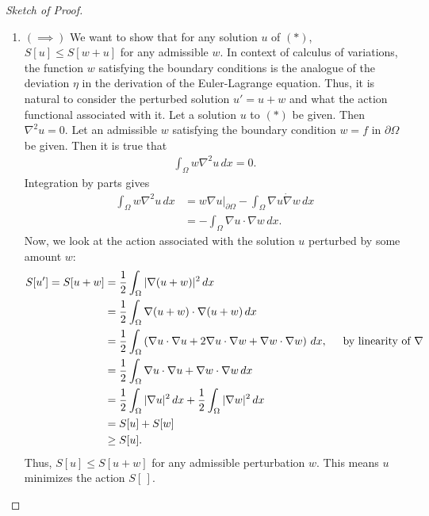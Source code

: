 \documentclass{article}
\newcommand{\p}{\partial}
\newcommand{\f}[2]{\frac{#1}{#2}}
\newcommand{\lp}{\left(}
\newcommand{\rp}{\right)}
\begin{document}
\begin{proof}[Sketch of Proof]
	$\,$
	\begin{enumerate}
		\item $(\implies)$ We want to show that for any solution $u$ of $(\ast)$, $S[u] \leq S[w+u]$ for any admissible $w$. In context of calculus of variations, the function $w$ satisfying the boundary conditions is the analogue of the deviation $\eta$ in the derivation of the Euler-Lagrange equation. Thus, it is natural to consider the perturbed solution $u' = u + w$ and what the action functional associated with it. Let a solution $u$ to $(\ast)$ be given. Then $\nabla^2u = 0$. Let an admissible $w$ satisfying the boundary condition $w = f$ in $\p \Omega$ be given. Then it is true that
		\begin{align}
		\int_\Omega w\nabla^2 u\,dx = 0.
		\end{align}
		Integration by parts gives
		\begin{align}
		\int_\Omega w\nabla^2 u\,dx &= w\nabla u\bigg\vert_{\p\Omega} - \int_\Omega \nabla u \dot \nabla w\,dx \nonumber \\
		&= - \int_\Omega \nabla u \cdot \nabla w\,dx.
		\end{align}
		Now, we look at the action associated with the solution $u$ perturbed by some amount $w$: 
		\begin{align}
		S[u'] = S[u+w] &= \f{1}{2}\int_\Omega \vert \nabla(u+w) \vert^2\,dx \nonumber \\
		&=  \f{1}{2}\int_\Omega \nabla(u+w) \cdot \nabla(u+w)\,dx \nonumber \\
		&= \f{1}{2}\int_\Omega \lp\nabla u \cdot \nabla u + 2 \nabla u \cdot \nabla w + \nabla w \cdot \nabla w \rp \,dx\nonumber, \hspace{0.5cm}\text{by linearity of $\nabla$}\\
		&= \f{1}{2}\int_\Omega \nabla u \cdot \nabla u + \nabla w \cdot \nabla w\,dx\nonumber\\
		&= \f{1}{2}\int_\Omega \vert \nabla u \vert^2\,dx + \f{1}{2}\int_\Omega \vert \nabla w \vert^2\,dx\nonumber\\
		&= S[u] + S[w]\nonumber\\
		&\geq S[u].
		\end{align}
		Thus, $S[u] \leq S[u + w]$ for any admissible perturbation $w$. This means $u$ minimizes the action $S[\,]$.
		

\end{enumerate}
\end{proof}
\end{document}
